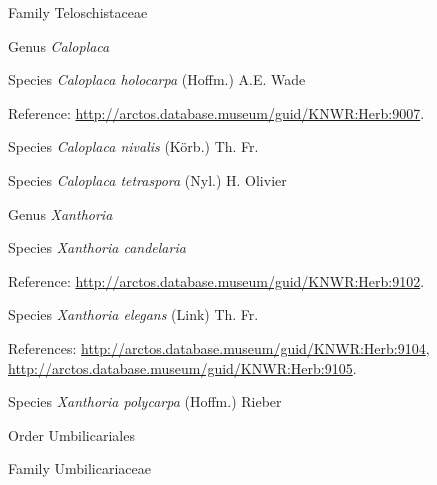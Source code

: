 \documentclass[9pt, article]{memoir}
\begin{document}
\begin{multicols}{2}
\vspace{6pt}\noindent\hspace{24pt}Family Teloschistaceae


\vspace{6pt}\noindent\hspace{30pt}Genus \textit{Caloplaca}


\vspace{6pt}\noindent\hspace{36pt}Species \textit{Caloplaca holocarpa} (Hoffm.) A.E. Wade


\vspace{6pt}Reference: 
\url{http://arctos.database.museum/guid/KNWR:Herb:9007}.

\vspace{6pt}\noindent\hspace{36pt}Species \textit{Caloplaca nivalis} (Körb.) Th. Fr.


\vspace{6pt}\noindent\hspace{36pt}Species \textit{Caloplaca tetraspora} (Nyl.) H. Olivier


\vspace{6pt}\noindent\hspace{30pt}Genus \textit{Xanthoria}


\vspace{6pt}\noindent\hspace{36pt}Species \textit{Xanthoria candelaria}


\vspace{6pt}Reference: 
\url{http://arctos.database.museum/guid/KNWR:Herb:9102}.

\vspace{6pt}\noindent\hspace{36pt}Species \textit{Xanthoria elegans} (Link) Th. Fr.


\vspace{6pt}References: 
\url{http://arctos.database.museum/guid/KNWR:Herb:9104}, 
\url{http://arctos.database.museum/guid/KNWR:Herb:9105}.

\vspace{6pt}\noindent\hspace{36pt}Species \textit{Xanthoria polycarpa} (Hoffm.) Rieber


\vspace{6pt}\noindent\hspace{18pt}Order Umbilicariales


\vspace{6pt}\noindent\hspace{24pt}Family Umbilicariaceae



\end{multicols}
\end{document}
